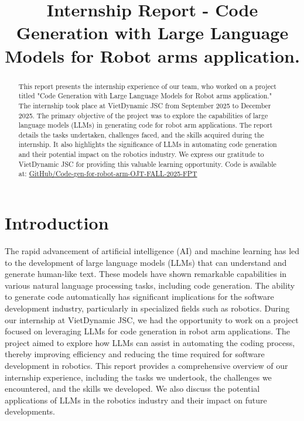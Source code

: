 \documentclass[conference]{IEEEtran}
\begin{document}
\title{Internship Report - Code Generation with Large Language Models for Robot arms application.}

\author{
}
\maketitle

\begin{abstract}
This report presents the internship experience of our team, who worked on a project titled "Code Generation with Large Language Models for Robot arms application." The internship took place at VietDynamic JSC from September 2025 to December 2025. The primary objective of the project was to explore the capabilities of large language models (LLMs) in generating code for robot arm applications. The report details the tasks undertaken, challenges faced, and the skills acquired during the internship. It also highlights the significance of LLMs in automating code generation and their potential impact on the robotics industry. We express our gratitude to VietDynamic JSC for providing this valuable learning opportunity. 
Code is available at: \href{https://github.com/Minhtrna/Code-gen-for-robot-arm-OJT-FALL-2025-FPT}{GitHub/Code-gen-for-robot-arm-OJT-FALL-2025-FPT}
\end{abstract}

\section{Introduction}
The rapid advancement of artificial intelligence (AI) and machine learning has led to the development of large language models (LLMs) that can understand and generate human-like text. These models have shown remarkable capabilities in various natural language processing tasks, including code generation. The ability to generate code automatically has significant implications for the software development industry, particularly in specialized fields such as robotics.
During our internship at VietDynamic JSC, we had the opportunity to work on a project focused on leveraging LLMs for code generation in robot arm applications. The project aimed to explore how LLMs can assist in automating the coding process, thereby improving efficiency and reducing the time required for software development in robotics.
This report provides a comprehensive overview of our internship experience, including the tasks we undertook, the 
challenges we encountered, and the skills we developed. We also discuss the potential applications of LLMs in the robotics industry and their impact on future developments.
\end{document}
